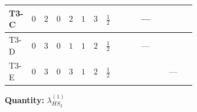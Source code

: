 \documentclass[8pt]{article}
\begin{document}
\begin{landscape}
\begin{longtable}{@{}llcccccc >{\raggedright\arraybackslash}p{0.21\linewidth} >{\raggedright\arraybackslash}p{0.21\linewidth} >{\raggedright\arraybackslash}p{0.21\linewidth}@{}}
\midrule
T3-C & $0$ & $2$ & $0$ & $2$ & $1$ & $3$ & $\frac{1}{2}$ & \scriptsize\adjustbox{max width=\linewidth}{$\begin{gathered} +6 {\lambda_{HS_2}^{(1)}} {\lambda_{S_2}^{(1)}}\end{gathered}$} & --- & \scriptsize\adjustbox{max width=\linewidth}{$\begin{gathered} {\lambda_{HS_2}^{(1)}} (6 \operatorname{Tr}\!\left({Y_d}\,\left({Y_d}\right)^{\dagger}\right)+2 \operatorname{Tr}\!\left({Y_e}\,\left({Y_e}\right)^{\dagger}\right)+6 \operatorname{Tr}\!\left({Y_u}\,\left({Y_u}\right)^{\dagger}\right))\end{gathered}$} \\
\midrule
T3-D & $0$ & $3$ & $0$ & $1$ & $1$ & $2$ & $\frac{1}{2}$ & \scriptsize\adjustbox{max width=\linewidth}{$\begin{gathered} +4 {\lambda_{HS_2}^{(1)}} {\lambda_{S_2}^{(1)}}\end{gathered}$} & --- & \scriptsize\adjustbox{max width=\linewidth}{$\begin{gathered} {\lambda_{HS_2}^{(1)}} (6 \operatorname{Tr}\!\left({Y_d}\,\left({Y_d}\right)^{\dagger}\right)+2 \operatorname{Tr}\!\left({Y_e}\,\left({Y_e}\right)^{\dagger}\right)+6 \operatorname{Tr}\!\left({Y_u}\,\left({Y_u}\right)^{\dagger}\right))\end{gathered}$} \\
\midrule
T3-E & $0$ & $3$ & $0$ & $3$ & $1$ & $2$ & $\frac{1}{2}$ & \scriptsize\adjustbox{max width=\linewidth}{$\begin{gathered} +8 {\lambda_{HS_2}^{(1)}} {\lambda_{S_2}^{(1)}}\end{gathered}$} & \scriptsize\adjustbox{max width=\linewidth}{$\begin{gathered} +6 {\lambda_{HS_2}^{(A)}}^2\end{gathered}$} & --- \\
\midrule
\bottomrule
\end{longtable}
\clearpage
\noindent\textbf{Quantity: }$\lambda_{HS_2}^{(1)}$\par\smallskip

\end{landscape}
\end{document}
